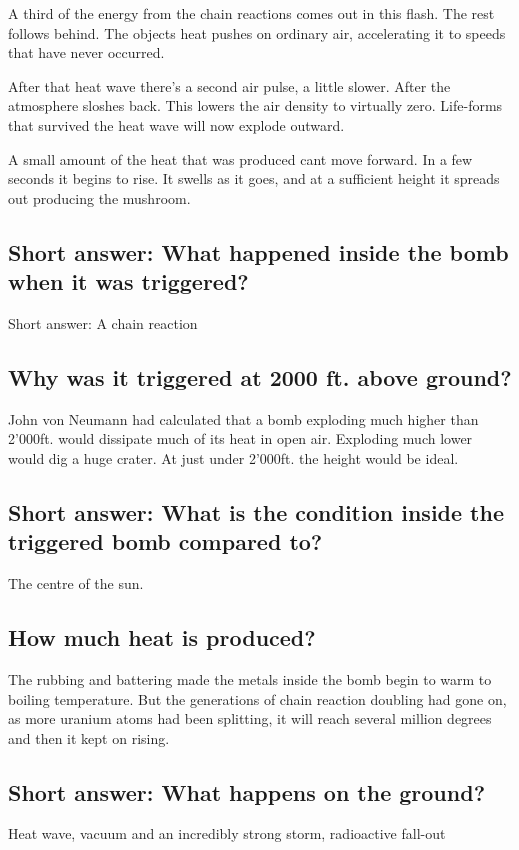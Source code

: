 A third of the energy from the chain reactions comes out in this flash. The rest follows behind. The objects heat pushes on ordinary air, accelerating it to speeds that have never occurred. 

After that heat wave there's a second air pulse, a little slower. After the atmosphere sloshes back. This lowers the air density to virtually zero. Life-forms that survived the heat wave will now explode outward.

A small amount of the heat that was produced cant move forward. In a few seconds it begins to rise. It swells as it goes, and at a sufficient height it spreads out producing the mushroom.

\subsection*{Short answer: What happened inside the bomb when it was triggered?}
Short answer: A chain reaction

\subsection*{Why was it triggered at 2000 ft. above ground?}
John von Neumann had calculated that a bomb exploding much higher than 2'000ft. would dissipate much of its heat in open air. Exploding much lower would dig a huge crater. At just under 2'000ft. the height would be ideal.

\subsection*{Short answer: What is the condition inside the triggered bomb compared to?}
The centre of the sun.

\subsection*{How much heat is produced?}
The rubbing and battering made the metals inside the bomb begin to warm to boiling temperature. But the generations of chain reaction doubling had gone on, as more uranium atoms had been splitting, it will reach several million degrees and then it kept on rising.


\subsection*{Short answer: What happens on the ground?}
Heat wave, vacuum and an incredibly strong storm, radioactive fall-out